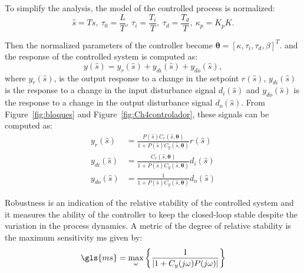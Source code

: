 To simplify the analysis, the model of the controlled process is normalized:
%
\begin{equation*}
\hat{s}= Ts, \ \tau_0=  \displaystyle\frac{L}{T}, \ \tau_i=  \displaystyle\frac{T_i}{T}, \ \tau_d = \frac{T_d}{T}, \ \kappa_p= K_p K.
\end{equation*}  %

Then the normalized parameters of the controller become $\bm{\theta}=\left[\kappa, \tau_i, \tau_d, \beta\right]^T$.
%
and the response of the controlled system is computed as: 
\begin{equation} 
 y(\hat{s})= y_r(\hat{s}) + y_{di}(\hat{s}) + y_{do}(\hat{s}),
\label{ys}
\end{equation}
%
where $y_r(\hat{s})$, is the output response to a change in the setpoint $r(\hat{s})$, $y_{di}(\hat{s})$ is the response to a change in the input disturbance signal $d_i(\hat{s})$ and $y_{do}(\hat{s})$ is the response to a change in the output disturbance signal $d_o(\hat{s})$. From Figure~\ref{fig:bloques} and Figure~\ref{fig:Ch4controlador}, these signals can be computed as:
%
\begin{align*}
 y_r(\hat{s}) &= \frac{P(\hat{s}) C_r(\hat{s},\bm{\theta}) }{1 + P(\hat{s}) C_y(\hat{s},\bm{\theta})} r(\hat{s})\\
y_{di}(\hat{s}) &=  \frac{C_r(\hat{s},\bm{\theta})}{1 + P(\hat{s}) C_y(\hat{s},\bm{\theta})} d_i(\hat{s}) \\%
y_{do}(\hat{s}) &= \frac{1}{1 + P(\hat{s}) C_y(\hat{s},\bm{\theta})} {d_o(\hat{s})}
\label{ytot}
\end{align*}


Robustness is an indication of the relative stability of the controlled system and it measures the ability of the controller to keep the closed-loop stable despite the variation in the process dynamics. A metric of the degree of relative stability is the maximum sensitivity \gls{ms} given by:
%
\begin{equation}  %
\gls{ms}=  \max_\omega \left\{ \frac{1}{\left |{1 + C_y(j\omega ) P(j\omega )}\right |}\right\} 
\label{Ms}
\end{equation}


